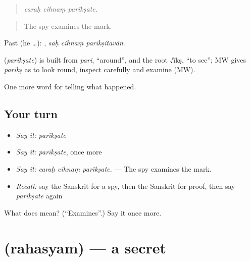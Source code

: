 \begin{quote}
  
\end{quote}

\begin{quote}
\emph{caraḥ cihnaṃ parīkṣate.}
\end{quote}

\begin{quote}
The spy examines the mark.
\end{quote}

Past (he …):   , \emph{saḥ cihnaṃ parīkṣitavān}.

\begin{cousinweb}
\textbf{} (\emph{parīkṣate}) is built from \emph{pari}, \textquotedblleft{}around\textquotedblright{}, and the root √īkṣ, \textquotedblleft{}to see\textquotedblright{}; MW gives \emph{parīkṣ} as to look round, inspect carefully and examine (MW).
\end{cousinweb}

\begin{grammarlens}[title={What you've built}]
One more word for telling what happened.
\end{grammarlens}

\subsection*{Your turn}
\begin{itemize}
\raggedright
  \item \emph{Say it:} \emph{parīkṣate}
  \item \emph{Say it:} \emph{parīkṣate}, once more
  \item \emph{Say it:} \emph{caraḥ cihnaṃ parīkṣate.} — The spy examines the mark.
  \item \emph{Recall:} say the Sanskrit for a spy, then the Sanskrit for proof, then say \emph{parīkṣate} again
\end{itemize}

\begin{tcolorbox}[breakable,colback=teal!4,colframe=teal!35!black,title={Before you move on}]
What does  mean? (\textquotedblleft{}Examines\textquotedblright{}.) Say it once more.
\end{tcolorbox}
\section[\texorpdfstring{\sk{रहस्यम्} (rahasyam)}{रहस्यम् (rahasyam)}]{ (rahasyam) — a secret}

